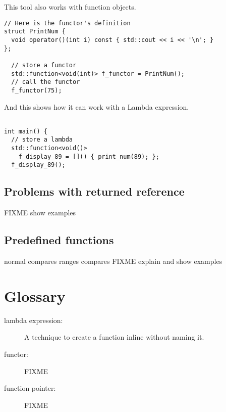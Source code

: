 This tool also works with function objects.
\begin{lstlisting}
// Here is the functor's definition
struct PrintNum {
  void operator()(int i) const { std::cout << i << '\n'; }
};

  // store a functor
  std::function<void(int)> f_functor = PrintNum();
  // call the functor
  f_functor(75);
\end{lstlisting}

And this shows how it can work with a Lambda expression.
\begin{lstlisting}

int main() {
  // store a lambda
  std::function<void()> 
    f_display_89 = []() { print_num(89); };
  f_display_89();

\end{lstlisting}

\subsection{Problems with returned reference}
FIXME show examples

\subsection{Predefined functions}
normal compares
ranges compares
FIXME explain and show examples

\section{Glossary}

\begin{description}
\item[lambda expression:] A technique to create a function inline without naming it.
\item[functor:] FIXME
\item[function pointer:] FIXME
\end{description}
